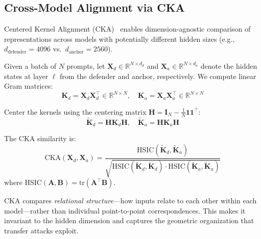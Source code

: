 \documentclass[11pt]{article}
\newcommand{\R}{\mathbb{R}}
\begin{document}
\subsection{Cross-Model Alignment via CKA}

Centered Kernel Alignment (CKA)~\cite{kornblith2019similarity} enables dimension-agnostic comparison of representations across models with potentially different hidden sizes (e.g., $d_{\text{defender}} = 4096$ vs.\ $d_{\text{anchor}} = 2560$).

Given a batch of $N$ prompts, let $\mathbf{X}_d \in \R^{N \times d_d}$ and $\mathbf{X}_a \in \R^{N \times d_a}$ denote the hidden states at layer $\ell$ from the defender and anchor, respectively. We compute linear Gram matrices:
\begin{equation}
    \mathbf{K}_d = \mathbf{X}_d \mathbf{X}_d^\top \in \R^{N \times N}, \quad
    \mathbf{K}_a = \mathbf{X}_a \mathbf{X}_a^\top \in \R^{N \times N}
\end{equation}

Center the kernels using the centering matrix $\mathbf{H} = \mathbf{I}_N - \frac{1}{N}\mathbf{1}\mathbf{1}^\top$:
\begin{equation}
    \tilde{\mathbf{K}}_d = \mathbf{H} \mathbf{K}_d \mathbf{H}, \quad
    \tilde{\mathbf{K}}_a = \mathbf{H} \mathbf{K}_a \mathbf{H}
\end{equation}

The CKA similarity is:
\begin{equation}
    \text{CKA}(\mathbf{X}_d, \mathbf{X}_a) = \frac{\text{HSIC}(\tilde{\mathbf{K}}_d, \tilde{\mathbf{K}}_a)}{\sqrt{\text{HSIC}(\tilde{\mathbf{K}}_d, \tilde{\mathbf{K}}_d) \cdot \text{HSIC}(\tilde{\mathbf{K}}_a, \tilde{\mathbf{K}}_a)}}
\end{equation}
where $\text{HSIC}(\mathbf{A}, \mathbf{B}) = \text{tr}(\mathbf{A}^\top \mathbf{B})$.

CKA compares \emph{relational structure}---how inputs relate to each other within each model---rather than individual point-to-point correspondences. This makes it invariant to the hidden dimension and captures the geometric organization that transfer attacks exploit.
\end{document}
